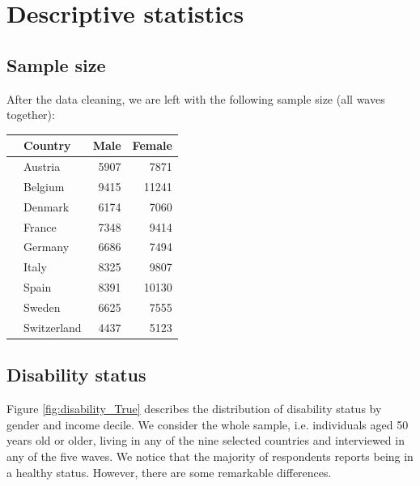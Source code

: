 \documentclass[\main/main.tex]{subfiles}
\begin{document}
\section{Descriptive statistics}

\subsection{Sample size}
After the data cleaning, we are left with the following sample size (all waves together):

\begin{center}
    \begin{tabular}{llrr}

\toprule
{} & Country &     Male   &   Female     \\
\midrule
 & Austria &   5907 &   7871 \\
        & Belgium &   9415 &  11241 \\
        & Denmark &   6174 &   7060 \\
        & France &   7348 &   9414 \\
        & Germany &   6686 &   7494 \\
        & Italy &   8325 &   9807 \\
        & Spain &   8391 &  10130 \\
        & Sweden &   6625 &   7555 \\
        & Switzerland &   4437 &   5123 \\
\bottomrule
\end{tabular}
\end{center}

\subsection{Disability status}
Figure \ref{fig:disability_True} describes the distribution of disability status by gender and income decile. We consider the whole sample, i.e. individuals aged 50 years old or older, living in any of the nine selected countries and interviewed in any of the five waves. We notice that the majority of respondents reports being in a healthy status. However, there are some remarkable differences.
\end{document}
